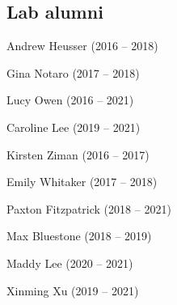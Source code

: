 \documentclass{tufte-book} %
\begin{document}
\begin{fullwidth}
\subsection{Lab alumni}
\begin{multicols}{2}\raggedcolumns
\begin{list}{\quad}{}
\item Andrew Heusser (2016 -- 2018)
\item Gina Notaro (2017 -- 2018)
\end{list}
\end{multicols}

\begin{multicols}{2}\raggedcolumns
  \begin{list}{\quad}{}
  \item Lucy Owen (2016 -- 2021)
  \item Caroline Lee (2019 -- 2021)
  \end{list}
  \end{multicols}

\begin{multicols}{2}\raggedcolumns
\begin{list}{\quad}{}
\item Kirsten Ziman (2016 -- 2017)
\item Emily Whitaker (2017 -- 2018)
\item Paxton Fitzpatrick (2018 -- 2021)

\end{list}
\end{multicols}


\begin{multicols}{2}\raggedcolumns
\begin{list}{\quad}{}
\item Max Bluestone (2018 -- 2019)
\item Maddy Lee (2020 -- 2021)
\item Xinming Xu (2019 -- 2021)
\end{list}
\end{multicols}



\end{fullwidth}
\end{document}
